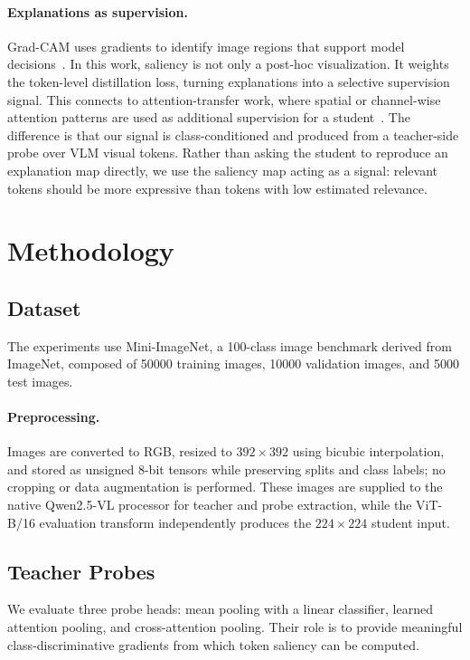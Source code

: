 \documentclass{article}
\begin{document}
\paragraph{Explanations as supervision.}
Grad-CAM uses gradients to identify image regions that support model decisions~\citep{selvaraju2017gradcam}.
In this work, saliency is not only a post-hoc visualization.
It weights the token-level distillation loss, turning explanations into a selective supervision signal.
This connects to attention-transfer work, where spatial or channel-wise attention patterns are used as additional supervision for a student~\citep{zagoruyko2017attention}.
The difference is that our signal is class-conditioned and produced from a teacher-side probe over VLM visual tokens.
Rather than asking the student to reproduce an explanation map directly, we use the saliency map acting as a signal: relevant tokens should be more expressive than tokens with low estimated relevance.


\section{Methodology}
\label{sec:method}

\subsection{Dataset}

The experiments use Mini-ImageNet, a 100-class image benchmark derived from ImageNet, composed of 50000 training images, 10000 validation images, and 5000 test images.

\paragraph{Preprocessing.}
Images are converted to RGB, resized to $392\times392$ using bicubic interpolation, and stored as unsigned 8-bit tensors while preserving splits and class labels; no cropping or data augmentation is performed.
These images are supplied to the native Qwen2.5-VL processor for teacher and probe extraction, while the ViT-B/16 evaluation transform independently produces the $224\times224$ student input.


\subsection{Teacher Probes}

We evaluate three probe heads: mean pooling with a linear classifier, learned attention pooling, and cross-attention pooling. Their role is to provide meaningful class-discriminative gradients from which token saliency can be computed.
\end{document}
